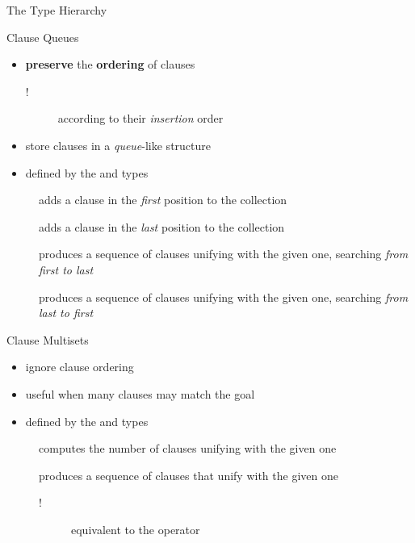 \documentclass[handout]{beamer}
\begin{document}
\begin{frame}[allowframebreaks]{The  Type Hierarchy}
    \begin{block}{Clause Queues}
        \begin{itemize}
            \item \textbf{preserve} the \textbf{ordering} of clauses
            \begin{description}
                \item [!] according to their \textit{insertion} order
            \end{description}
            \item store clauses in a \textit{queue}-like structure
            \item defined by the  and  types
        \end{itemize}
    \end{block}
    \begin{description}
        \item[] adds a clause in the \textit{first} position to the collection
        \item[]  adds a clause in the \textit{last} position to the collection
        \item[] produces a sequence of clauses unifying with the given one, searching \textit{from first to last}
        \item[] produces a sequence of clauses unifying with the given one, searching \textit{from last to first}
    \end{description}

    \framebreak

    \begin{block}{Clause Multisets}
        \begin{itemize}
            \item ignore clause ordering
            \item useful when many clauses may match the goal
            \item defined by the  and  types
        \end{itemize}
    \end{block}
    \begin{description}
        \item[] computes the number of clauses unifying with the given one
        \item[] produces a sequence of clauses that unify with the given one
        \begin{description}
            \item[!] equivalent to the \kt{[]} operator
        \end{description}
    \end{description}

\end{frame}
\end{document}
